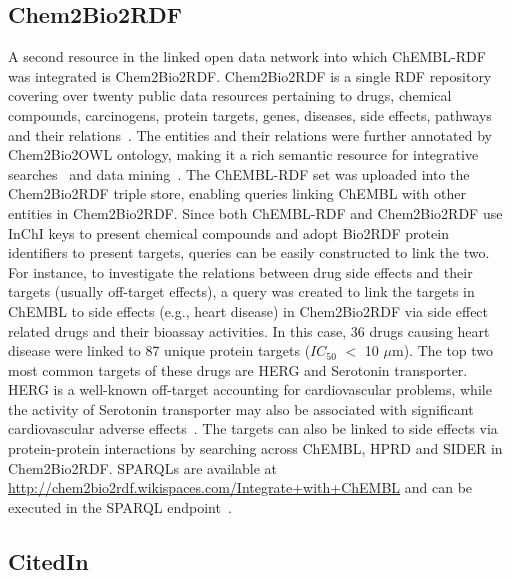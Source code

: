 \documentclass[10pt]{bmc_article}
\newenvironment{bmcformat}{\begin{raggedright}\baselineskip20pt\sloppy\setboolean{publ}{false}}{\end{raggedright}\baselineskip20pt\sloppy}
\begin{document}
\begin{bmcformat}
\subsection*{Chem2Bio2RDF}

A second resource in the linked open data network into which ChEMBL-RDF was integrated is Chem2Bio2RDF.
Chem2Bio2RDF is a single RDF repository covering over twenty public data resources pertaining to drugs, chemical compounds, carcinogens,
protein targets, genes, diseases, side effects, pathways and their relations~\cite{Chen2010}. The entities and their relations were
further annotated by Chem2Bio2OWL ontology, making it a rich semantic resource for integrative searches~\cite{Chen2012a} and
data mining~\cite{Chen2012b}. The ChEMBL-RDF set was uploaded into the Chem2Bio2RDF triple store, enabling
queries linking ChEMBL with other entities in Chem2Bio2RDF. Since both ChEMBL-RDF and Chem2Bio2RDF use InChI keys to present chemical
compounds and adopt Bio2RDF protein identifiers to present targets, queries can be easily constructed to link the two. For instance,
to investigate the relations between drug side effects and their targets (usually off-target effects), a query was created to link the
targets in ChEMBL to side effects (e.g., heart disease) in Chem2Bio2RDF via side effect related drugs and their bioassay activities.
In this case, 36 drugs causing heart disease were linked to 87 unique protein targets ($IC_{50}$ $<$ 10 $\mu$m). The top two most common targets
of these drugs are HERG and Serotonin transporter. HERG is a well-known off-target accounting for cardiovascular problems, while
the activity of Serotonin transporter may also be associated with significant cardiovascular adverse effects~\cite{Levy2006}. 
The targets can also be linked to side effects via protein-protein interactions by searching across ChEMBL, HPRD and SIDER in
Chem2Bio2RDF. SPARQLs are available at \url{http://chem2bio2rdf.wikispaces.com/Integrate+with+ChEMBL} and can be executed in the
SPARQL endpoint~\cite{Chen2010}.



\subsection*{CitedIn}


\end{bmcformat}
\end{document}
